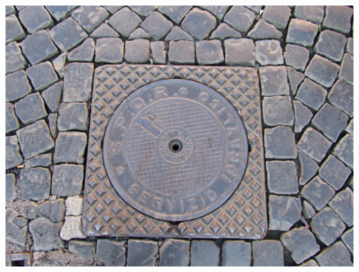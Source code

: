 \begin{frame}
    \centering
    \includegraphics[width=.9\textwidth]{img/fasces/manhole.JPG} \\
\end{frame}

